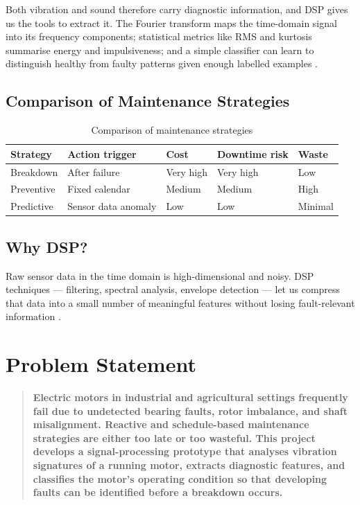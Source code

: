 \documentclass[12pt,a4paper]{article}
\begin{document}
Both vibration and sound therefore carry diagnostic information,
and DSP gives us the tools to extract it. The Fourier transform
maps the time-domain signal into its frequency components;
statistical metrics like RMS and kurtosis summarise energy and
impulsiveness; and a simple classifier can learn to distinguish
healthy from faulty patterns given enough labelled examples
\cite{lei2020}.

\subsection{Comparison of Maintenance Strategies}

\begin{table}[htbp]
\centering
\caption{Comparison of maintenance strategies}
\begin{tabular}{@{}lllll@{}}
\toprule
\textbf{Strategy} & \textbf{Action trigger} & \textbf{Cost}
  & \textbf{Downtime risk} & \textbf{Waste} \\
\midrule
Breakdown   & After failure        & Very high & Very high & Low \\
Preventive  & Fixed calendar       & Medium    & Medium    & High \\
Predictive  & Sensor data anomaly  & Low       & Low       & Minimal \\
\bottomrule
\end{tabular}
\label{tab:maint}
\end{table}

\subsection{Why DSP?}

Raw sensor data in the time domain is high-dimensional and noisy.
DSP techniques --- filtering, spectral analysis, envelope detection
--- let us compress that data into a small number of meaningful
features without losing fault-relevant information
\cite{brandt2011}.

\section{Problem Statement}

\begin{quote}
\textbf{Electric motors in industrial and agricultural settings
frequently fail due to undetected bearing faults, rotor imbalance,
and shaft misalignment. Reactive and schedule-based maintenance
strategies are either too late or too wasteful. This project
develops a signal-processing prototype that analyses vibration
signatures of a running motor, extracts diagnostic features, and
classifies the motor's operating condition so that developing
faults can be identified before a breakdown occurs.}
\end{quote}
\end{document}
